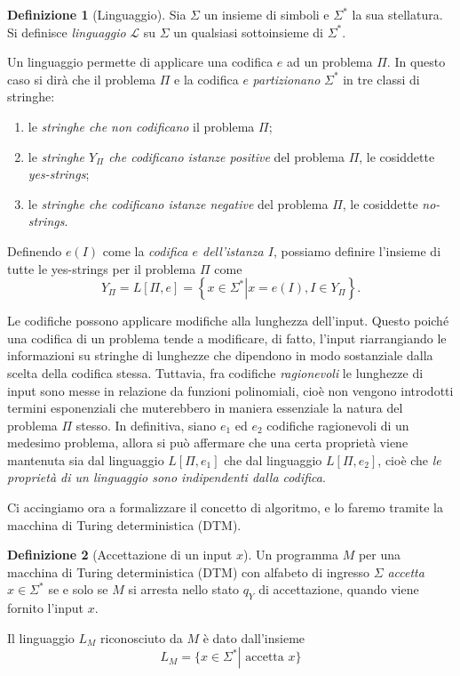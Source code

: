 \documentclass[10pt]{\classname}
\theoremstyle{newlinethm}
\theoremstyle{theorem}
\theoremstyle{definition}
\newtheorem{definizione}{Definizione}[section]
\theoremstyle{definition}
\theoremstyle{definition}
\theoremstyle{definition}
\begin{document}
\begin{definizione}[Linguaggio]
    Sia $\Sigma$ un insieme di simboli e $\Sigma^*$ la sua stellatura. Si definisce \emph{linguaggio} $\mathcal L$ su $\Sigma$ un qualsiasi sottoinsieme di $\Sigma^*$.
\end{definizione}
Un linguaggio permette di applicare una codifica $e$ ad un problema $\Pi$. In questo caso si dirà che il problema $\Pi$ e la codifica $e$ \emph{partizionano} $\Sigma^*$ in tre classi di stringhe:
\begin{enumerate}
    \item le \emph{stringhe che non codificano} il problema $\Pi$;
    \item le \emph{stringhe $Y_\Pi$ che codificano istanze positive} del problema $\Pi$, le cosiddette \emph{yes-strings};
    \item le \emph{stringhe che codificano istanze negative} del problema $\Pi$, le cosiddette \emph{no-strings}.
\end{enumerate}
Definendo $e(I)$ come la \emph{codifica $e$ dell'istanza $I$}, possiamo definire l'insieme di tutte le yes-strings per il problema $\Pi$ come \[Y_\Pi = L[\Pi, e] = \left\{x \in \Sigma^* \left|\right. x = e(I), I \in Y_\Pi\right\}.\]

Le codifiche possono applicare modifiche alla lunghezza dell'input. Questo poiché una codifica di un problema tende a modificare, di fatto, l'input riarrangiando le informazioni su stringhe di lunghezze che dipendono in modo sostanziale dalla scelta della codifica stessa. Tuttavia, fra codifiche \emph{ragionevoli} le lunghezze di input sono messe in relazione da funzioni polinomiali, cioè non vengono introdotti termini esponenziali che muterebbero in maniera essenziale la natura del problema $\Pi$ stesso. In definitiva, siano $e_1$ ed $e_2$ codifiche ragionevoli di un medesimo problema, allora si può affermare che una certa proprietà viene mantenuta sia dal linguaggio $L[\Pi, e_1]$ che dal linguaggio $L[\Pi, e_2]$, cioè che \emph{le proprietà di un linguaggio sono indipendenti dalla codifica}.

Ci accingiamo ora a formalizzare il concetto di algoritmo, e lo faremo tramite la macchina di Turing deterministica (DTM).

\begin{definizione}[Accettazione di un input $x$]
    Un programma $M$ per una macchina di Turing deterministica (DTM) con alfabeto di ingresso $\Sigma$ \emph{accetta $x \in \Sigma^*$} se e solo se $M$ si arresta nello stato $q_Y$ di accettazione, quando viene fornito l'input $x$.

    Il linguaggio $L_M$ riconosciuto da $M$ è dato dall'insieme \[L_M = \{x \in \Sigma^* \left|\right. \mbox{ accetta } x\}\]
\end{definizione}
\end{document}

